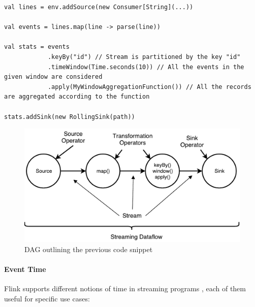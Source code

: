 \begin{code}

\begin{verbatim}
val lines = env.addSource(new Consumer[String](...))

val events = lines.map(line -> parse(line))

val stats = events
            .keyBy("id") // Stream is partitioned by the key "id" 
            .timeWindow(Time.seconds(10)) // All the events in the given window are considered 
            .apply(MyWindowAggregationFunction()) // All the records are aggregated according to the function      

stats.addSink(new RollingSink(path))
\end{verbatim}

\end{code}

\begin{figure}[h]
	\centering
	\includegraphics[scale=0.75]{Figures/dataflow.pdf}
	\decoRule
	\caption[Streaming Dataflow]{DAG outlining the previous code snippet}
	\label{fig:Dataflow}
\end{figure}

\paragraph{Event Time}

Flink supports different notions of time in streaming programs \cite{flink_eventtime}, each of them useful for specific use cases:

